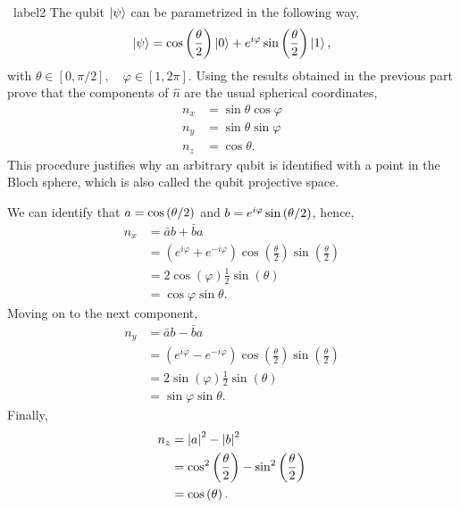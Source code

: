 \documentclass[a4paper]{tufte-handout} %
\begin{document}
\begin{prob}{~}{label2}
    The qubit $\ket{\psi}$ can be parametrized in the following way,
    \begin{equation}
        \ket{\psi} = \cos\left(\frac{\theta}{2}\right)\ket{0} + e^{i\varphi}\sin\left(\frac{\theta}{2}\right)\ket{1},
    \end{equation}
    with $\theta\in[0,\pi/2],\quad\varphi\in[1,2\pi].$
    Using the results obtained in the previous part prove that the components of $\hat{n}$ are the usual spherical coordinates,
    \begin{align*}
        n_x &= \sin\theta\cos\varphi \\
        n_y &= \sin\theta\sin\varphi \\
        n_z &= \cos\theta.
    \end{align*}
    This procedure justifies why an arbitrary qubit is identified with a point in the Bloch sphere, which is also called the qubit projective space.
\end{prob}


We can identify that $a=\cos\qty(\theta/2)$ and $b=e^{i\varphi}\sin\qty(\theta/2)$, hence,
\begin{align*}
    n_x &= \bar{a}b + \bar{b}a \\
        &= \left(e^{i\varphi}+e^{-i\varphi}\right)\cos\left(\frac{\theta}{2}\right)\sin\left(\frac{\theta}{2}\right) \\
        &= 2\cos\left(\varphi\right)\frac{1}{2}\sin\left(\theta\right)\\
        &= \cos\varphi\sin\theta.
\end{align*}
Moving on to the next component,
\begin{align*}
    n_y &= \bar{a}b - \bar{b}a \\
        &= \left(e^{i\varphi} - e^{-i\varphi}\right)\cos\left(\frac{\theta}{2}\right)\sin\left(\frac{\theta}{2}\right) \\
        &= 2\sin\left(\varphi\right)\frac{1}{2}\sin\left(\theta\right)\\
        &= \sin\varphi\sin\theta.
\end{align*}
Finally,
\begin{align*}
    n_z &= \abs{a}^2 - \abs{b}^2 \\
        &= \cos^2\left(\frac{\theta}{2}\right) - \sin^2\left(\frac{\theta}{2}\right) \\
        &= \cos\left(\theta\right).
\end{align*}
\end{document}
